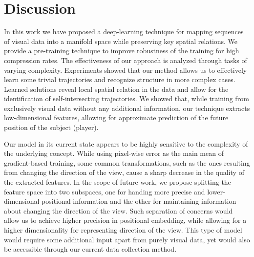 
\chapter{Discussion}
\label{ch:conc}

In this work we have proposed a deep-learning technique for mapping sequences of visual data into a manifold space while preserving key spatial relations.
We provide a pre-training technique to improve robustness of the training for high compression rates.
The effectiveness of our approach is analyzed through tasks of varying complexity.
Experiments showed that our method allows us to effectively learn some trivial trajectories and recognize structure in more complex cases.
Learned solutions reveal local spatial relation in the data and allow for the identification of self-intersecting trajectories.
We showed that, while training from exclusively visual data without any additional information, our technique extracts low-dimensional features, allowing for approximate prediction of the future position of the subject (player).

Our model in its current state appears to be highly sensitive to the complexity of the underlying concept. While using pixel-wise error as the main mean of gradient-based training, some common transformations, such as the ones resulting from changing the direction of the view, cause a sharp decrease in the quality of the extracted features. In the scope of future work, we propose splitting the feature space into two subspaces, one for handing more precise and lower-dimensional positional information and the other for maintaining information about changing the direction of the view. Such separation of concerns would allow us to achieve higher precision in positional embedding, while allowing for a higher dimensionality for representing direction of the view. This type of model would require some additional input apart from purely visual data, yet would also be accessible through our current data collection method.
